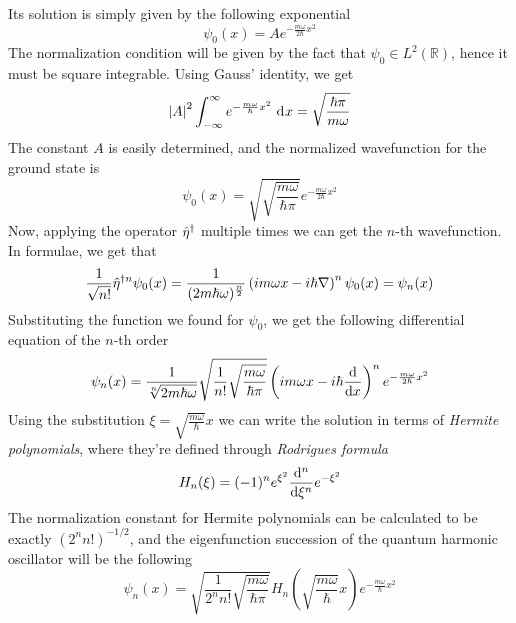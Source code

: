 \documentclass[../qm.tex]{subfiles}
\begin{document}
	Its solution is simply given by the following exponential
	\begin{equation*}
		\psi_0(x)=Ae^{-\frac{m\omega}{2\hbar}x^2}
	\end{equation*}
	The normalization condition will be given by the fact that $\psi_0\in L^2(\mathbb{R})$, hence it must be square integrable. Using Gauss' identity, we get
	\begin{equation*}
		\abs{A}^2\int_{-\infty}^{\infty}e^{-\frac{m\omega}{\hbar}x^2}\diff{x}=\sqrt{\frac{\hbar\pi}{m\omega}}
	\end{equation*}
	The constant $A$ is easily determined, and the normalized wavefunction for the ground state is
	\begin{equation}
		\psi_0(x)=\sqrt{\sqrt{\frac{m\omega}{\hbar\pi}}}e^{-\frac{m\omega}{2\hbar}x^2}
		\label{eq:qhogsnorm}
	\end{equation}
	Now, applying the operator $\adj{\opr{\eta}}$ multiple times we can get the $n$-th wavefunction. In formulae, we get that
	\begin{equation*}
		\frac{1}{\sqrt{n!}}\adj[n]{\opr{\eta}}\psi_0(x)=\frac{1}{(2m\hbar\omega)^\frac{n}{2}}\left( im\omega x-i\hbar\nabla \right)^n\psi_0(x)=\psi_n(x)
	\end{equation*}
	Substituting the function we found for $\psi_0$, we get the following differential equation of the $n$-th order
	\begin{equation}
		\psi_n(x)=\frac{1}{\sqrt[n]{2m\hbar\omega}}\sqrt{\frac{1}{n!}\sqrt{\frac{m\omega}{\hbar\pi}}}\left( im\omega x-i\hbar\derivative{x} \right)^ne^{-\frac{m\omega}{2\hbar}x^2}
		\label{eq:nthqhoeigenfunc}
	\end{equation}
	Using the substitution $\xi=\sqrt{\frac{m\omega}{\hbar}}x$ we can write the solution in terms of \textit{Hermite polynomials}, where they're defined through \textit{Rodrigues formula}
	\begin{equation}
		H_n(\xi)=(-1)^ne^{\xi^2}\derivative[n]{\xi}e^{-\xi^2}
		\label{eq:rodrigueshermite}
	\end{equation}
	The normalization constant for Hermite polynomials can be calculated to be exactly $(2^nn!)^{-1/2}$, and the eigenfunction succession of the quantum harmonic oscillator will be the following
	\begin{equation}
		\psi_n(x)=\sqrt{\frac{1}{2^nn!}\sqrt{\frac{m\omega}{\hbar\pi}}}H_n\left( \sqrt{\frac{m\omega}{\hbar}}x \right)e^{-\frac{m\omega}{\hbar}x^2}
		\label{eq:psinqho}
	\end{equation}
\end{document}
